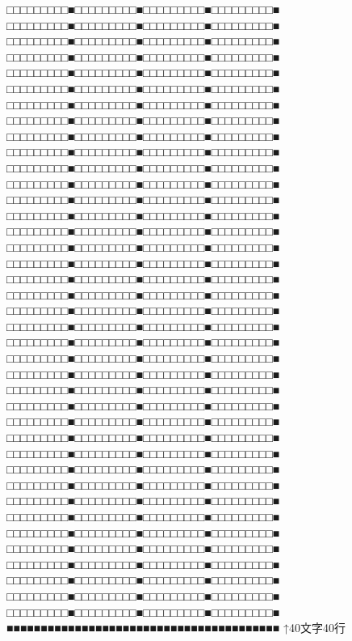\newpage\noindent
□□□□□□□□□■□□□□□□□□□■□□□□□□□□□■□□□□□□□□□■
□□□□□□□□□■□□□□□□□□□■□□□□□□□□□■□□□□□□□□□■
□□□□□□□□□■□□□□□□□□□■□□□□□□□□□■□□□□□□□□□■
□□□□□□□□□■□□□□□□□□□■□□□□□□□□□■□□□□□□□□□■
□□□□□□□□□■□□□□□□□□□■□□□□□□□□□■□□□□□□□□□■
□□□□□□□□□■□□□□□□□□□■□□□□□□□□□■□□□□□□□□□■
□□□□□□□□□■□□□□□□□□□■□□□□□□□□□■□□□□□□□□□■
□□□□□□□□□■□□□□□□□□□■□□□□□□□□□■□□□□□□□□□■
□□□□□□□□□■□□□□□□□□□■□□□□□□□□□■□□□□□□□□□■
□□□□□□□□□■□□□□□□□□□■□□□□□□□□□■□□□□□□□□□■
□□□□□□□□□■□□□□□□□□□■□□□□□□□□□■□□□□□□□□□■
□□□□□□□□□■□□□□□□□□□■□□□□□□□□□■□□□□□□□□□■
□□□□□□□□□■□□□□□□□□□■□□□□□□□□□■□□□□□□□□□■
□□□□□□□□□■□□□□□□□□□■□□□□□□□□□■□□□□□□□□□■
□□□□□□□□□■□□□□□□□□□■□□□□□□□□□■□□□□□□□□□■
□□□□□□□□□■□□□□□□□□□■□□□□□□□□□■□□□□□□□□□■
□□□□□□□□□■□□□□□□□□□■□□□□□□□□□■□□□□□□□□□■
□□□□□□□□□■□□□□□□□□□■□□□□□□□□□■□□□□□□□□□■
□□□□□□□□□■□□□□□□□□□■□□□□□□□□□■□□□□□□□□□■
□□□□□□□□□■□□□□□□□□□■□□□□□□□□□■□□□□□□□□□■
□□□□□□□□□■□□□□□□□□□■□□□□□□□□□■□□□□□□□□□■
□□□□□□□□□■□□□□□□□□□■□□□□□□□□□■□□□□□□□□□■
□□□□□□□□□■□□□□□□□□□■□□□□□□□□□■□□□□□□□□□■
□□□□□□□□□■□□□□□□□□□■□□□□□□□□□■□□□□□□□□□■
□□□□□□□□□■□□□□□□□□□■□□□□□□□□□■□□□□□□□□□■
□□□□□□□□□■□□□□□□□□□■□□□□□□□□□■□□□□□□□□□■
□□□□□□□□□■□□□□□□□□□■□□□□□□□□□■□□□□□□□□□■
□□□□□□□□□■□□□□□□□□□■□□□□□□□□□■□□□□□□□□□■
□□□□□□□□□■□□□□□□□□□■□□□□□□□□□■□□□□□□□□□■
□□□□□□□□□■□□□□□□□□□■□□□□□□□□□■□□□□□□□□□■
□□□□□□□□□■□□□□□□□□□■□□□□□□□□□■□□□□□□□□□■
□□□□□□□□□■□□□□□□□□□■□□□□□□□□□■□□□□□□□□□■
□□□□□□□□□■□□□□□□□□□■□□□□□□□□□■□□□□□□□□□■
□□□□□□□□□■□□□□□□□□□■□□□□□□□□□■□□□□□□□□□■
□□□□□□□□□■□□□□□□□□□■□□□□□□□□□■□□□□□□□□□■
□□□□□□□□□■□□□□□□□□□■□□□□□□□□□■□□□□□□□□□■
□□□□□□□□□■□□□□□□□□□■□□□□□□□□□■□□□□□□□□□■
□□□□□□□□□■□□□□□□□□□■□□□□□□□□□■□□□□□□□□□■
□□□□□□□□□■□□□□□□□□□■□□□□□□□□□■□□□□□□□□□■
■■■■■■■■■■■■■■■■■■■■■■■■■■■■■■■■■■■■■■■■
↑40文字40行
